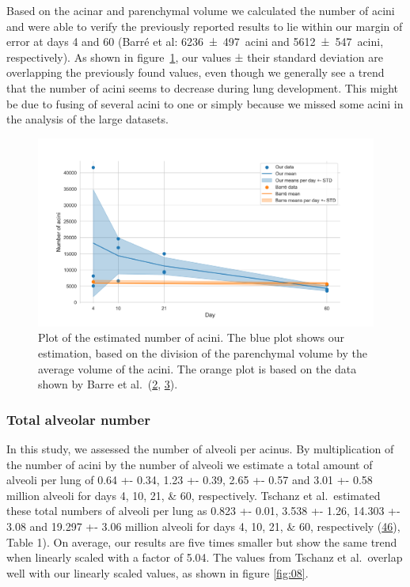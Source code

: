\documentclass[
  american,
]{article}
\begin{document}
Based on the acinar and parenchymal volume we calculated the number of acini and were able to verify the previously reported results to lie within our margin of error at days 4 and 60 (Barré et al: 6236~±~497~acini and 5612~±~547~acini, respectively).
As shown in figure~\ref{fig:07}, our values ± their standard deviation are overlapping the previously found values, even though we generally see a trend that the number of acini seems to decrease during lung development.
This might be due to fusing of several acini to one or simply because we missed some acini in the analysis of the large datasets.

\begin{figure}
\hypertarget{fig:07}{%
\centering
\includegraphics{images/fig07.png}
\caption{Plot of the estimated number of acini.
The blue plot shows our estimation, based on the division of the parenchymal volume by the average volume of the acini.
The orange plot is based on the data shown by Barre et al.~(\protect\hyperlink{ref-14OP85b2F}{2}, \protect\hyperlink{ref-uFNlWogb}{3}).}\label{fig:07}
}
\end{figure}

\hypertarget{total-alveolar-number}{%
\subsubsection{Total alveolar number}\label{total-alveolar-number}}

In this study, we assessed the number of alveoli per acinus.
By multiplication of the number of acini by the number of alveoli we estimate a total amount of alveoli per lung of 0.64 +- 0.34, 1.23 +- 0.39, 2.65 +- 0.57 and 3.01 +- 0.58 million alveoli for days 4, 10, 21, \& 60, respectively.
Tschanz et al.~estimated these total numbers of alveoli per lung as 0.823 +- 0.01, 3.538 +- 1.26, 14.303 +- 3.08 and 19.297 +- 3.06 million alveoli for days 4, 10, 21, \& 60, respectively (\protect\hyperlink{ref-wnl86DEM}{46}), Table 1).
On average, our results are five times smaller but show the same trend when linearly scaled with a factor of 5.04.
The values from Tschanz et al.~overlap well with our linearly scaled values, as shown in figure \ref{fig:08}.
\end{document}
